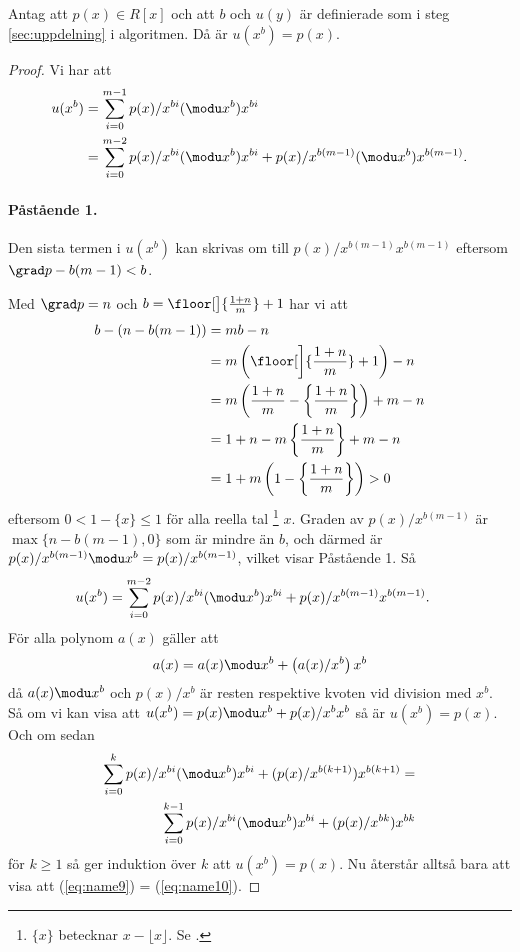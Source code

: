 \begin{lemma}
  \label{lemma:2}
  Antag att $p(x) \in R[x]$ och att $b$ och $u(y)$ är definierade som i steg \ref{sec:uppdelning}
  i algoritmen. Då är $u(x^b)=p(x)$.
\end{lemma}
\begin{proof}
  Vi har att
  \begin{align*}
    u(x^b) &= \sum_{i = 0}^{m-1} p(x)/x^{bi} (\modu x^b) x^{bi} \\
           &= \sum_{i = 0}^{m-2} p(x)/x^{bi} (\modu x^b) x^{bi} + p(x)/x^{b(m-1)} (\modu x^b) x^{b (m-1)}.
  \end{align*}
  \paragraph{Påstående 1.} Den sista termen i $u(x^b)$ kan skrivas om till
  $p(x)/x^{b (m-1)} x^{b (m-1)}$ eftersom $\grad p - b (m-1) < b$.

  Med $\grad p = n$ och $b = \floor[\big]{\frac{1 + n}{m}} + 1$ har vi att
  \begin{align*}
    b - (n - b(m-1)) &= m b - n \\
                     &= m \left( \floor[\bigg]{\frac{1 + n}{m}} + 1 \right) - n \\
                     &= m \left( \frac{1 + n}{m} - \left\{ \frac{1 + n}{m} \right\} \right) + m - n \\
                     &= 1 + n - m \left\{ \frac{1 + n}{m} \right\} + m - n \\
                     &= 1 + m \left( 1 - \left\{ \frac{1 + n}{m} \right\} \right) > 0
  \end{align*}
  eftersom $0 < 1 - \{ x \} \leq 1$ för alla reella tal
  \footnote{$\{x\}$ betecknar $x-\lfloor x \rfloor$. Se \cite{graham1989concrete}.}
  $x$. Graden av $p(x)/x^{b(m-1)}$ är $\max \{n - b(m-1),0\}$ som är mindre än $b$,
  och därmed är $p(x)/x^{b(m-1)} \modu x^b = p(x)/x^{b(m-1)}$, vilket visar
  Påstående 1. Så
  \begin{align*}
    u(x^b) &= \sum_{i = 0}^{m-2} p(x)/x^{bi} (\modu x^b) x^{bi} + p(x)/x^{b(m-1)} x^{b(m-1)}.
  \end{align*}
  För alla polynom $a(x)$ gäller att
  \begin{align}
    a(x) = a(x) \modu x^b + \left(a(x)/x^b\right) x^b \label{eq:name8}
  \end{align}
  då $a(x) \modu x^b$ och $p(x)/x^{b}$ är resten respektive kvoten vid division
  med $x^b$. Så om vi kan visa att $u(x^b) = p(x) \modu x^b + p(x)/x^{b} x^{b}$
  så är $u(x^b) = p(x)$. Och om sedan
  \begin{align}
    \sum_{i = 0}^{k} p(x)/x^{bi} (\modu x^b) x^{bi} + (p(x)/x^{b(k + 1)}) x^{b(k + 1)} = \label{eq:name9} \\
    \sum_{i = 0}^{k-1} p(x)/x^{bi} (\modu x^b) x^{bi} + (p(x)/x^{b k}) x^{b k} \label{eq:name10}
  \end{align}
  för $k \geq 1$ så ger induktion över $k$ att $u(x^b) = p(x)$. Nu återstår
  alltså bara att visa att (\ref{eq:name9}) = (\ref{eq:name10}).


\end{proof}
